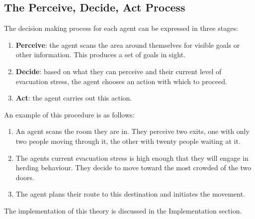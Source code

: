 \subsection{The Perceive, Decide, Act Process}
\label{Res:subsec:perceiveDecideAct}
The decision making process for each agent can be expressed in three stages:
\begin{enumerate}
  \item{\textbf{Perceive}: the agent scans the area around themselves for visible goals or other information. This produces a set of goals in sight.}
  \item{\textbf{Decide}: based on what they can perceive and their current level of evacuation stress, the agent chooses an action with which to proceed.}
  \item{\textbf{Act}: the agent carries out this action.}
\end{enumerate}
An example of this procedure is as follows:
\begin{enumerate}
  \item{An agent scans the room they are in. They perceive two exits, one with only two people moving through it, the other with twenty people waiting at it.}
  \item{The agents current evacuation stress is high enough that they will engage in herding behaviour. They decide to move toward the most crowded of the two doors.}
  \item{The agent plans their route to this destination and initiates the movement.}
\end{enumerate}
 The implementation of this theory is discussed in the Implementation section.

%
%
%
